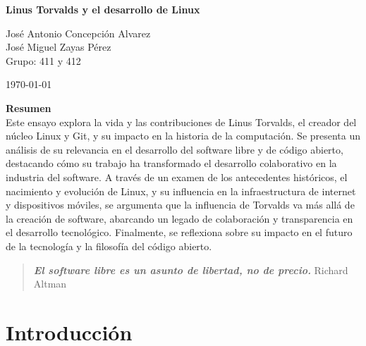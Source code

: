 \documentclass[a4paper,12pt]{article}
\begin{document}
\begin{titlepage}
    \centering
    

    \vspace{1cm}
    \newpage
    
    {\Huge \textbf{Linus Torvalds y el desarrollo de Linux}}\\
    \vspace{0.5cm}
    
    {\Large José Antonio Concepción Alvarez \\  José Miguel Zayas Pérez \\ Grupo: 411 y 412}
    
    {\large \today}
   \thispagestyle{empty} 
\end{titlepage}

\renewcommand{\refname}{Bibliografía y Anexos}



\begin{centering}
    \vspace{2cm}
    \textbf{Resumen}\\
    Este ensayo explora la vida y las contribuciones de Linus Torvalds, el
    creador del núcleo Linux y Git, y su impacto en la historia de la
    computación. Se presenta un análisis de su relevancia en el desarrollo del
    software libre y de código abierto, destacando cómo su trabajo ha
    transformado el desarrollo colaborativo en la industria del software. A
    través de un examen de los antecedentes históricos, el nacimiento y
    evolución de Linux, y su influencia en la infraestructura de internet y
    dispositivos móviles, se argumenta que la influencia de Torvalds va más allá
    de la creación de software, abarcando un legado de colaboración y
    transparencia en el desarrollo tecnológico. Finalmente, se reflexiona sobre
    su impacto en el futuro de la tecnología y la filosofía del código abierto.
\end{centering}
\newpage

\tableofcontents



\newpage
\hypersetup{linkcolor=blue, urlcolor=blue, citecolor=blue}


\begin{quote}
\textbf{\textit{El software libre es un asunto de libertad, no de precio.}} 
Richard Altman
\end{quote}


\section{Introducción}
\end{document}
